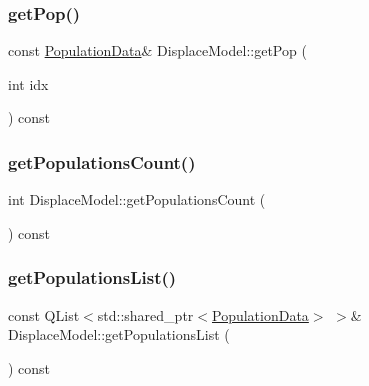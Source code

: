 \mbox{\label{class_displace_model_ac825c5ee7f50854a4356c2c45d69f965}} 
\subsubsection{\texorpdfstring{getPop()}{getPop()}}
{\footnotesize\ttfamily const \mbox{\hyperlink{class_population_data}{Population\+Data}}\& Displace\+Model\+::get\+Pop (\begin{DoxyParamCaption}\item[{int}]{idx }\end{DoxyParamCaption}) const\hspace{0.3cm}{\ttfamily [inline]}}

\mbox{\label{class_displace_model_a860cd84569af7e6825350c6373183699}} 
\subsubsection{\texorpdfstring{getPopulationsCount()}{getPopulationsCount()}}
{\footnotesize\ttfamily int Displace\+Model\+::get\+Populations\+Count (\begin{DoxyParamCaption}{ }\end{DoxyParamCaption}) const}

\mbox{\label{class_displace_model_aea43bf1e18f08a8f2431ce18058c5e23}} 
\subsubsection{\texorpdfstring{getPopulationsList()}{getPopulationsList()}}
{\footnotesize\ttfamily const Q\+List$<$std\+::shared\+\_\+ptr$<$\mbox{\hyperlink{class_population_data}{Population\+Data}}$>$ $>$\& Displace\+Model\+::get\+Populations\+List (\begin{DoxyParamCaption}{ }\end{DoxyParamCaption}) const\hspace{0.3cm}{\ttfamily [inline]}}

